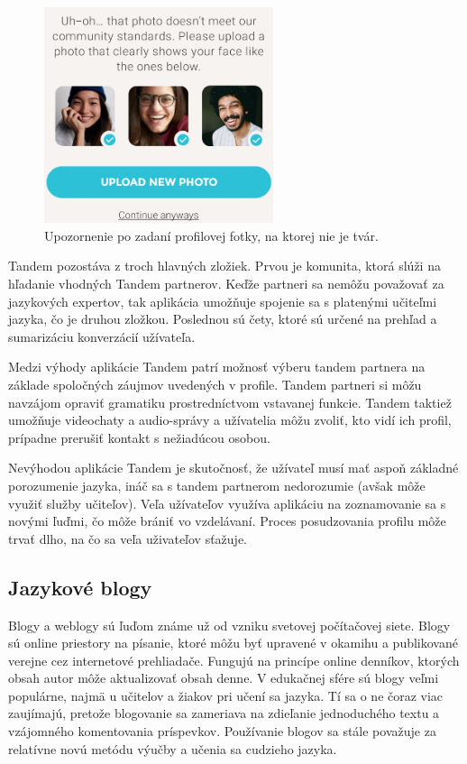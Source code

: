 \documentclass[10pt,oneside,slovak,a4paper]{article}
\begin{document}
\begin{figure}[h] %
\centering
\includegraphics[width=0.6\textwidth,height=0.3\textheight]{tandem2.png}
\caption{Upozornenie po zadaní profilovej fotky, na ktorej nie je tvár.}
\label{tandem-obmedzenia}
\end{figure}

Tandem pozostáva z troch hlavných zložiek. Prvou je komunita, ktorá slúži na hľadanie vhodných Tandem partnerov. Keďže partneri sa nemôžu považovať za jazykových expertov, tak aplikácia umožňuje spojenie sa s platenými učiteľmi jazyka, čo je druhou zložkou. Poslednou sú čety, ktoré sú určené na prehľad a sumarizáciu konverzácií užívateľa.

 Medzi výhody aplikácie Tandem patrí možnosť výberu tandem partnera na základe spoločných záujmov uvedených v profile.
Tandem partneri si môžu navzájom opraviť gramatiku prostredníctvom vstavanej funkcie.
Tandem taktiež umožňuje videochaty a audio-správy a
užívatelia môžu zvoliť, kto vidí ich profil, prípadne prerušiť kontakt s nežiadúcou osobou. \cite{tandem}

Nevýhodou aplikácie Tandem je skutočnosť, že
užívateľ musí mať aspoň základné porozumenie jazyka, ináč sa s tandem partnerom nedorozumie (avšak môže využiť služby učiteľov).
Veľa užívateľov využíva aplikáciu na zoznamovanie sa s novými ľuďmi, čo môže brániť vo vzdelávaní.
Proces posudzovania profilu môže trvať dlho, na čo sa veľa uživateľov sťažuje. \cite{tandem}

\subsection{Jazykové blogy} %

Blogy a weblogy sú ľuďom známe už od vzniku svetovej počítačovej siete. Blogy sú online priestory na písanie, ktoré môžu byť upravené v okamihu a publikované verejne cez internetové prehliadače. Fungujú na princípe online denníkov, ktorých obsah autor môže aktualizovať obsah denne. V edukačnej sfére sú blogy veľmi  populárne, najmä u učitelov a žiakov pri učení sa jazyka. Tí sa o ne čoraz viac zaujímajú, pretože blogovanie sa zameriava na zdieľanie jednoduchého textu a vzájomného komentovania príspevkov. Používanie blogov sa stále považuje za relatívne novú metódu výučby a učenia sa cudzieho jazyka. \cite{blog-mif}
\end{document}
